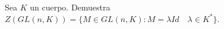 \question 
Sea $K$ un cuerpo. Demuestra 
$Z(GL(n,K))=\{M\in GL(n,K): M=\lambda Id \quad \lambda \in K^*\}$.